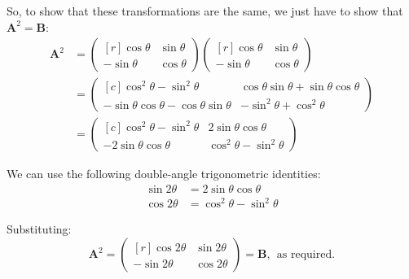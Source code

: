 \documentclass{article}
\begin{document}
So, to show that these transformations are the same, we just have to show that $\mathbf{A}^2 = \mathbf{B}$:
\[
    \begin{aligned}
    \mathbf{A}^2 &= 
    \begin{pmatrix*}[r]
    \cos\theta & \sin\theta \\
    -\sin\theta & \cos\theta
    \end{pmatrix*}
    \begin{pmatrix*}[r]
    \cos\theta & \sin\theta \\
    -\sin\theta & \cos\theta
    \end{pmatrix*} \\
    &= \begin{pmatrix*}[c]
    \cos^2\theta - \sin^2\theta & \cos\theta\sin\theta + \sin\theta\cos\theta\\
    -\sin\theta\cos\theta - \cos\theta\sin\theta & -\sin^2\theta + \cos^2\theta
    \end{pmatrix*} \\
    &= \begin{pmatrix*}[c]
    \cos^2\theta - \sin^2\theta & 2\sin\theta\cos\theta\\
    -2\sin\theta\cos\theta & \cos^2\theta - \sin^2\theta
    \end{pmatrix*}
    \end{aligned}
\]

We can use the following double-angle trigonometric identities:
\[
    \begin{aligned}
    \sin2\theta &= 2\sin\theta\cos\theta \\
    \cos2\theta &= \cos^2 \theta - \sin^2 \theta
    \end{aligned}
\]

Substituting:
\[
    \mathbf{A}^2 =
    \begin{pmatrix*}[r]
    \cos2\theta & \sin2\theta \\
    -\sin2\theta & \cos2\theta
    \end{pmatrix*}
    = \mathbf{B}, \>\>\text{as required.}
\]
\end{document}
